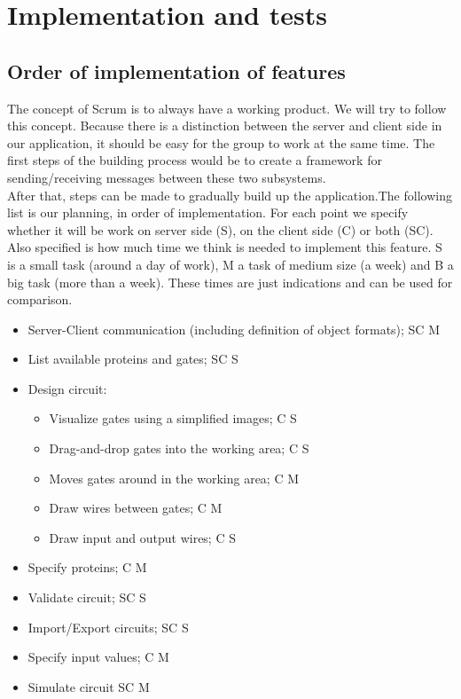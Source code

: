 \documentclass[a4paper]{article}
\begin{document}
\section{Implementation and tests}

\subsection{Order of implementation of features}
The concept of Scrum is to always have a working product. We will try to follow this concept. Because there is a distinction between the server and client side in our application, it should be easy for the group to work at the same time. The first steps of the building process would be to create a framework for sending/receiving messages between these two subsystems. \\

After that, steps can be made to gradually build up the application.The following list is our planning, in order of implementation. For each point we specify whether it will be work on server side (S), on the client side (C) or both (SC). Also specified is how much time we think is needed to implement this feature. S is a small task (around a day of work), M a task of medium size (a week) and B a big task (more than a week). These times are just indications and can be used for comparison.
\begin{itemize}
\item Server-Client communication (including definition of object formats);	\tabto{13.8cm} SC \tabto{14.6cm} M
\item List available proteins and gates; 									\tabto{13.8cm} SC \tabto{14.6cm} S
\item Design circuit:													%
	\begin{itemize}
	\item Visualize gates using a simplified images;						\tabto{13cm}  C \tabto{13.8cm} S
	\item Drag-and-drop gates into the working area;						\tabto{13cm}  C \tabto{13.8cm} S
	\item Moves gates around in the working area;							\tabto{13cm}  C \tabto{13.8cm} M
	\item Draw wires between gates;											\tabto{13cm}  C \tabto{13.8cm} M
	\item Draw input and output wires;										\tabto{13cm}  C \tabto{13.8cm} S
	\end{itemize}
\item Specify proteins;														\tabto{13.8cm}  C \tabto{14.6cm} M
\item Validate circuit;														\tabto{13.8cm} SC \tabto{14.6cm} S
\item Import/Export circuits;												\tabto{13.8cm} SC \tabto{14.6cm} S
\item Specify input values;													\tabto{13.8cm}  C \tabto{14.6cm} M
\item Simulate circuit														\tabto{13.8cm} SC \tabto{14.6cm} M
\end{itemize}~\\
\end{document}
